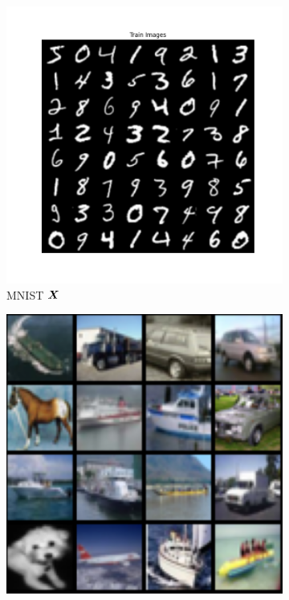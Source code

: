 \documentclass[../../book-main.tex]{subfiles}
\begin{document}
\begin{figure}[t]
    \begin{subfigure}[t]{0.3\textwidth}
        \centering
        \includegraphics[width=\textwidth]{chapters/chapter5/figs/MNIST_MNIST_train_images_epoch200.png}
        \caption{{\small MNIST $\bm{X}$}}
    \end{subfigure}
    \hfill
    \begin{subfigure}[t]{0.3\textwidth}
        \centering
        \includegraphics[width=\textwidth]{chapters/chapter5/figs/cifar_input.png}

\end{subfigure}
\end{figure}
\end{document}

